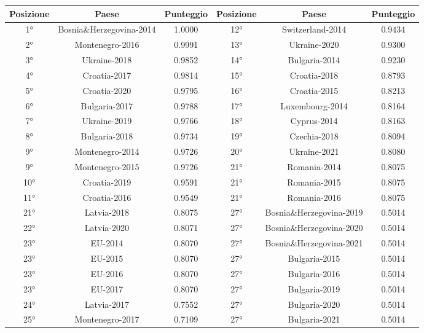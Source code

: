 \documentclass[a4paper,12pt, openright]{report}
\begin{document}
\setlength\tabcolsep{2pt}
\begin{longtable}[c]{|c|c|c|c|c|c|}
    \hline
    \textbf{Posizione} & \textbf{Paese} & \textbf{Punteggio} & \textbf{Posizione} & \textbf{Paese} & \textbf{Punteggio}\\
    \hline
     1° & Bosnia\&Herzegovina-2014  & 1.0000 &  12° &  Switzerland-2014 & 0.9434 \\ 
    \hline
    2°	& Montenegro-2016 & 0.9991 &  13° &  Ukraine-2020 & 0.9300 \\ 
    \hline
    3°	& Ukraine-2018 & 0.9852 &  14° &  Bulgaria-2014  & 0.9230 \\ 
    \hline
    4°	& Croatia-2017 & 0.9814 & 15° &  Croatia-2018 & 0.8793\\ 
    \hline
    5°	& Croatia-2020  & 0.9795 & 16° & Croatia-2015 & 0.8213 \\ 
    \hline
    6°	& Bulgaria-2017 & 0.9788 & 17° & Luxembourg-2014 & 0.8164 \\ 
    \hline
    7°	& Ukraine-2019 & 0.9766 & 18° & Cyprus-2014 & 0.8163 \\ 
    \hline
    8°	& Bulgaria-2018 & 0.9734  & 19° &  Czechia-2018  & 0.8094 \\ 
    \hline
    9°	& Montenegro-2014 & 0.9726 & 20° & Ukraine-2021 & 0.8080 \\
    \hline
    9° & Montenegro-2015 & 0.9726 & 21° &  Romania-2014 & 0.8075 \\
    \hline
    10° & Croatia-2019 & 0.9591 & 21° &  Romania-2015 & 0.8075 \\
    \hline
    11° & Croatia-2016 & 0.9549 & 21° & Romania-2016 & 0.8075 \\
    \hline
    21° & Latvia-2018  & 0.8075 & 27° &  Bosnia\&Herzegovina-2019  & 0.5014 \\
    \hline
    22° & Latvia-2020 & 0.8071 & 27° &  Bosnia\&Herzegovina-2020  & 0.5014\\
    \hline
    23° &  EU-2014 & 0.8070 & 27° & Bosnia\&Herzegovina-2021 & 0.5014\\
    \hline
    23° &  EU-2015 & 0.8070 & 27° & Bulgaria-2015 & 0.5014\\
    \hline
    23° & EU-2016 & 0.8070 & 27° & Bulgaria-2016  & 0.5014 \\
    \hline
    23° & EU-2017  & 0.8070 & 27° & Bulgaria-2019 & 0.5014\\
    \hline
    24° & Latvia-2017 & 0.7552 & 27° & Bulgaria-2020 & 0.5014\\
    \hline
    25° &  Montenegro-2017 & 0.7109 & 27°	&  Bulgaria-2021 & 0.5014\\

\end{longtable}
\end{document}
